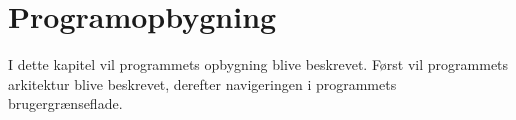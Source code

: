 \chapter{Programopbygning}

I dette kapitel vil programmets opbygning blive beskrevet. Først vil programmets arkitektur blive beskrevet, derefter navigeringen i programmets brugergrænseflade.







